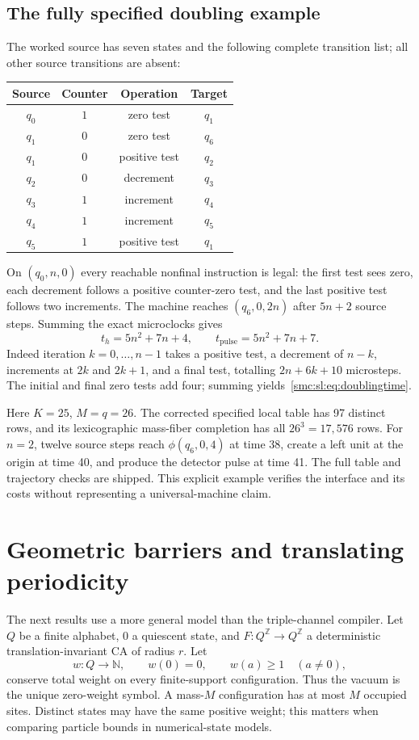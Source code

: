 \documentclass[11pt,letterpaper]{article}
\numberwithin{equation}{section}
\theoremstyle{definition}
\theoremstyle{remark}
\newcommand{\Z}{\mathbb Z}
\newcommand{\NN}{\mathbb N}
\begin{document}
\subsection{The fully specified doubling example}\label{smc:sl:sec:doubling}
The worked source has seven states and the following complete transition list; all other source transitions are absent:
\begin{center}
\begin{tabular}{@{}cccc@{}}
\toprule
Source & Counter & Operation & Target\\\midrule
$q_0$ & $1$ & zero test & $q_1$\\
$q_1$ & $0$ & zero test & $q_6$\\
$q_1$ & $0$ & positive test & $q_2$\\
$q_2$ & $0$ & decrement & $q_3$\\
$q_3$ & $1$ & increment & $q_4$\\
$q_4$ & $1$ & increment & $q_5$\\
$q_5$ & $1$ & positive test & $q_1$\\\bottomrule
\end{tabular}
\end{center}
On $(q_0,n,0)$ every reachable nonfinal instruction is legal: the first test sees zero, each decrement follows a positive counter-zero test, and the last positive test follows two increments. The machine reaches $(q_6,0,2n)$ after $5n+2$ source steps. Summing the exact microclocks gives
\begin{equation}\label{smc:sl:eq:doublingtime}
 t_h=5n^2+7n+4,\qquad t_{\mathrm{pulse}}=5n^2+7n+7.
\end{equation}
Indeed iteration $k=0,\ldots,n-1$ takes a positive test, a decrement of $n-k$, increments at $2k$ and $2k+1$, and a final test, totalling $2n+6k+10$ microsteps. The initial and final zero tests add four; summing yields~\eqref{smc:sl:eq:doublingtime}.

Here $K=25$, $M=q=26$. The corrected specified local table has 97 distinct rows, and its lexicographic mass-fiber completion has all $26^3=17{,}576$ rows. For $n=2$, twelve source steps reach $\phi(q_6,0,4)$ at time 38, create a left unit at the origin at time 40, and produce the detector pulse at time 41. The full table and trajectory checks are shipped. This explicit example verifies the interface and its costs without representing a universal-machine claim.
\section{Geometric barriers and translating periodicity}\label{smc:sl:sec:diameter}
The next results use a more general model than the triple-channel compiler. Let $Q$ be a finite alphabet, $0$ a quiescent state, and $F:Q^\Z\to Q^\Z$ a deterministic translation-invariant CA of radius $r$. Let
\[
 w:Q\to\NN,\qquad w(0)=0,\qquad w(a)\ge1\quad(a\ne0),
\]
conserve total weight on every finite-support configuration. Thus the vacuum is the unique zero-weight symbol. A mass-$M$ configuration has at most $M$ occupied sites. Distinct states may have the same positive weight; this matters when comparing particle bounds in numerical-state models.
\end{document}
